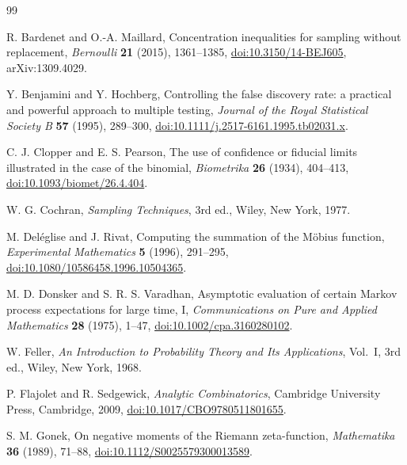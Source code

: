 \documentclass[11pt,reqno]{amsart}
\numberwithin{equation}{section}
\theoremstyle{plain}
\theoremstyle{definition}
\theoremstyle{remark}
\begin{document}
\begin{thebibliography}{99}
\raggedright

R. Bardenet and O.-A. Maillard,
\newblock Concentration inequalities for sampling without replacement,
\newblock \emph{Bernoulli} \textbf{21} (2015), 1361--1385,
\newblock \href{https://doi.org/10.3150/14-BEJ605}
{doi:10.3150/14-BEJ605}, arXiv:1309.4029.

Y. Benjamini and Y. Hochberg,
\newblock Controlling the false discovery rate: a practical and powerful
approach to multiple testing,
\newblock \emph{Journal of the Royal Statistical Society B} \textbf{57}
(1995), 289--300,
\newblock \href{https://doi.org/10.1111/j.2517-6161.1995.tb02031.x}
{doi:10.1111/j.2517-6161.1995.tb02031.x}.

C. J. Clopper and E. S. Pearson,
\newblock The use of confidence or fiducial limits illustrated in the case
of the binomial,
\newblock \emph{Biometrika} \textbf{26} (1934), 404--413,
\newblock \href{https://doi.org/10.1093/biomet/26.4.404}
{doi:10.1093/biomet/26.4.404}.

W. G. Cochran,
\newblock \emph{Sampling Techniques}, 3rd ed.,
\newblock Wiley, New York, 1977.

M. Del\'eglise and J. Rivat,
\newblock Computing the summation of the M\"obius function,
\newblock \emph{Experimental Mathematics} \textbf{5} (1996), 291--295,
\newblock \href{https://doi.org/10.1080/10586458.1996.10504365}
{doi:10.1080/10586458.1996.10504365}.

M. D. Donsker and S. R. S. Varadhan,
\newblock Asymptotic evaluation of certain Markov process expectations for
large time, I,
\newblock \emph{Communications on Pure and Applied Mathematics} \textbf{28}
(1975), 1--47,
\newblock \href{https://doi.org/10.1002/cpa.3160280102}
{doi:10.1002/cpa.3160280102}.

W. Feller,
\newblock \emph{An Introduction to Probability Theory and Its Applications},
Vol.~I, 3rd ed.,
\newblock Wiley, New York, 1968.

P. Flajolet and R. Sedgewick,
\newblock \emph{Analytic Combinatorics},
\newblock Cambridge University Press, Cambridge, 2009,
\newblock \href{https://doi.org/10.1017/CBO9780511801655}
{doi:10.1017/CBO9780511801655}.

S. M. Gonek,
\newblock On negative moments of the Riemann zeta-function,
\newblock \emph{Mathematika} \textbf{36} (1989), 71--88,
\newblock \href{https://doi.org/10.1112/S0025579300013589}
{doi:10.1112/S0025579300013589}.


\end{thebibliography}
\end{document}
